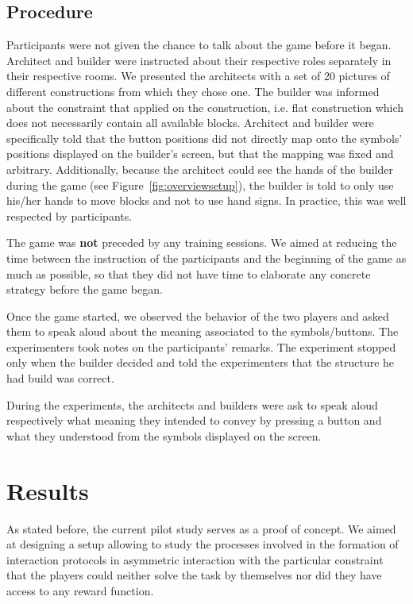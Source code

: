 \subsection{Procedure}
\label{sec:procedure}
Participants were not given the chance to talk about the game before it began. Architect and builder were instructed about their respective roles separately in their respective rooms. We presented the architects with a set of 20 pictures of different constructions from which they chose one. The builder was informed about the constraint that applied on the construction, i.e. flat construction which does not necessarily contain all available blocks. Architect and builder were specifically told that the button positions did not directly map onto the symbols' positions displayed on the builder's screen, but that the mapping was fixed and arbitrary. Additionally, because the architect could see the hands of the builder during the game (see Figure~\ref{fig:overviewsetup}), the builder is told to only use his/her hands to move blocks and not to use hand signs. In practice, this was well respected by participants.

The game was \textbf{not} preceded by any training sessions. We aimed at reducing the time between the instruction of the participants and the beginning of the game as much as possible, so that they did not have time to elaborate any concrete strategy before the game began. 

Once the game started, we observed the behavior of the two players and asked them to speak aloud about the meaning associated to the symbols/buttons. The experimenters took notes on the participants' remarks. The experiment stopped only when the builder decided and told the experimenters that the structure he had build was correct.

During the experiments, the architects and builders were ask to speak aloud respectively what meaning they intended to convey by pressing a button and what they understood from the symbols displayed on the screen. 

\section{Results}

As stated before, the current pilot study serves as a proof of concept. We aimed at designing a setup allowing to study the processes involved in the formation of interaction protocols in asymmetric interaction with the particular constraint that the players could neither solve the task by themselves nor did they have access to any reward function.

